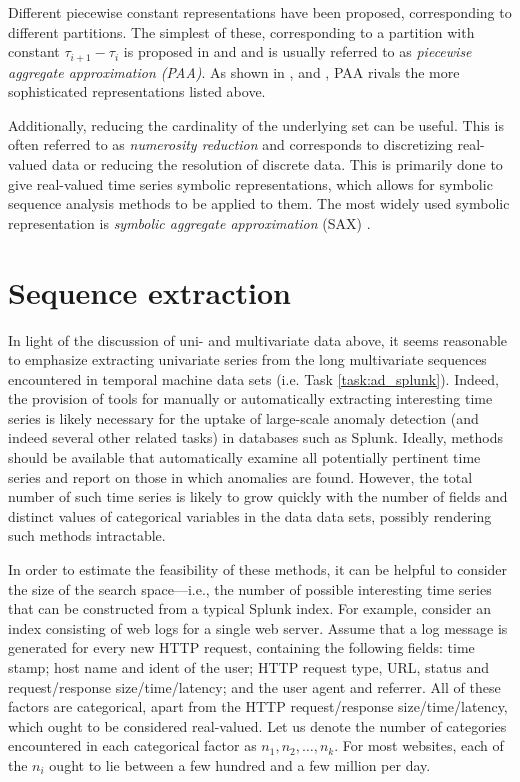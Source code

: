 Different piecewise constant representations have been proposed, corresponding to different partitions. The simplest of these, corresponding to a partition with constant $\tau_{i+1} - \tau_i$ is proposed in \cite{keogh4} and \cite{faloutsos2} and is usually referred to as \emph{piecewise aggregate approximation (PAA)}. As shown in \cite{keogh5}, \cite{keogh3} and \cite{faloutsos2}, PAA rivals the more sophisticated representations listed above. 

Additionally, reducing the cardinality of the underlying set can be useful. This is often referred to as \emph{numerosity reduction} and corresponds to discretizing real-valued data or reducing the resolution of discrete data. This is primarily done to give real-valued time series symbolic representations, which allows for symbolic sequence analysis methods to be applied to them. The most widely used symbolic representation is \emph{symbolic aggregate approximation} (SAX) \cite{sax}.

\section{Sequence extraction}
\label{sect:series_mining}

In light of the discussion of uni- and multivariate data above, it seems reasonable to emphasize extracting univariate series from the long multivariate sequences encountered in temporal machine data sets (i.e. Task \ref{task:ad_splunk}). Indeed, the provision of tools for manually or automatically extracting interesting time series is likely necessary for the uptake of large-scale anomaly detection (and indeed several other related tasks) in databases such as Splunk. Ideally, methods should be available that automatically examine all potentially pertinent time series and report on those in which anomalies are found. However, the total number of such time series is likely to grow quickly with the number of fields and distinct values of categorical variables in the data data sets, possibly rendering such methods intractable.

In order to estimate the feasibility of these methods, it can be helpful to consider the size of the search space---i.e., the number of possible interesting time series that can be constructed from a typical Splunk index. For example, consider an index consisting of web logs for a single web server. Assume that a log message is generated for every new HTTP request, containing the following fields: time stamp; host name and ident of the user; HTTP request type, URL, status and request/response size/time/latency; and the user agent and referrer. All of these factors are categorical, apart from the HTTP request/response size/time/latency, which ought to be considered real-valued. Let us denote the number of categories encountered in each categorical factor as $n_1, n_2, \dots, n_k$. For most websites, each of the $n_i$ ought to lie between a few hundred and a few million per day.

